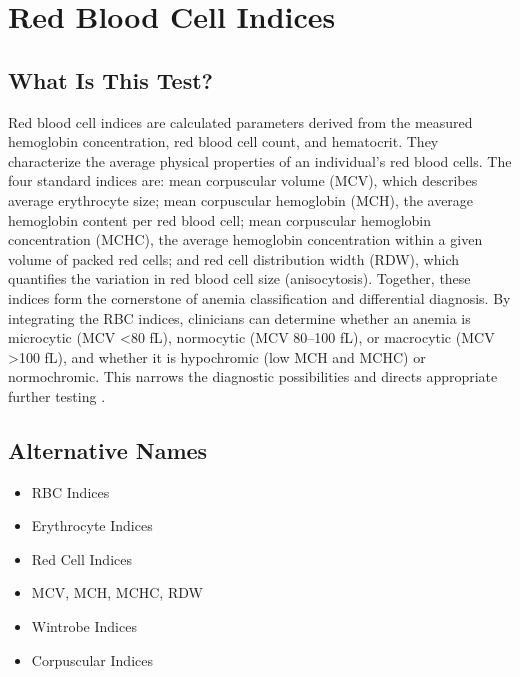 \chapter{Red Blood Cell Indices}

\section*{What Is This Test?}
Red blood cell indices are calculated parameters derived from the measured hemoglobin concentration, red blood cell count, and hematocrit. They characterize the average physical properties of an individual's red blood cells. The four standard indices are: mean corpuscular volume (MCV), which describes average erythrocyte size; mean corpuscular hemoglobin (MCH), the average hemoglobin content per red blood cell; mean corpuscular hemoglobin concentration (MCHC), the average hemoglobin concentration within a given volume of packed red cells; and red cell distribution width (RDW), which quantifies the variation in red blood cell size (anisocytosis). Together, these indices form the cornerstone of anemia classification and differential diagnosis. By integrating the RBC indices, clinicians can determine whether an anemia is microcytic (MCV <80 fL), normocytic (MCV 80--100 fL), or macrocytic (MCV >100 fL), and whether it is hypochromic (low MCH and MCHC) or normochromic. This narrows the diagnostic possibilities and directs appropriate further testing \cite{tierney2023current}.

\section*{Alternative Names}
\begin{itemize}
  \item RBC Indices
  \item Erythrocyte Indices
  \item Red Cell Indices
  \item MCV, MCH, MCHC, RDW
  \item Wintrobe Indices
  \item Corpuscular Indices
\end{itemize}
